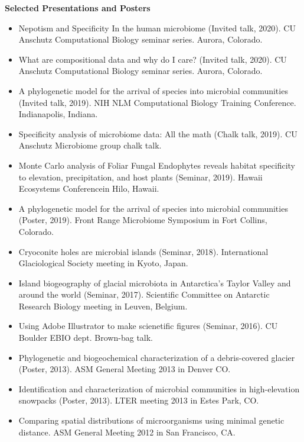 \documentclass{article}
\begin{document}
\pagebreak
{\large  \textbf{Selected Presentations and Posters}}
\begin{itemize}[noitemsep,topsep=0pt, leftmargin=5mm]
  \item Nepotism and Specificity In the human microbiome (Invited talk, 2020). CU Anschutz Computational Biology seminar series. Aurora, Colorado.
  \item What are compositional data and why do I care? (Invited talk, 2020). CU Anschutz Computational Biology seminar series. Aurora, Colorado.
  \item A phylogenetic model for the arrival of species into microbial communities (Invited talk, 2019). NIH NLM Computational Biology Training Conference. Indianapolis, Indiana.
  \item Specificity analysis of microbiome data: All the math (Chalk talk, 2019). CU Anschutz Microbiome group chalk talk.
  \item Monte Carlo analysis of Foliar Fungal Endophytes reveals habitat specificity to elevation, precipitation, and host plants (Seminar, 2019). Hawaii Ecosystems Conferencein  Hilo, Hawaii.
  \item A phylogenetic model for the arrival of species into microbial communities (Poster, 2019). Front Range Microbiome Symposium in Fort Collins, Colorado.
  \item Cryoconite holes are microbial islands (Seminar, 2018). International Glaciological Society meeting in Kyoto, Japan.
  \item Island biogeography of glacial microbiota in Antarctica’s Taylor Valley and around the world (Seminar, 2017). Scientific Committee on Antarctic Research Biology meeting in Leuven, Belgium.
  \item Using Adobe Illustrator to make scienetific figures (Seminar, 2016). CU Boulder EBIO dept. Brown-bag talk.
  \item Phylogenetic and biogeochemical characterization of a debris-covered glacier (Poster, 2013). ASM General Meeting 2013 in Denver CO.
  \item Identification and characterization of microbial communities in high-elevation snowpacks (Poster, 2013). LTER meeting 2013 in Estes Park, CO.
  \item Comparing spatial distributions of microorganisms using minimal genetic distance. ASM General Meeting 2012 in San Francisco, CA.
\end{itemize}
\vspace{3mm}
\end{document}
